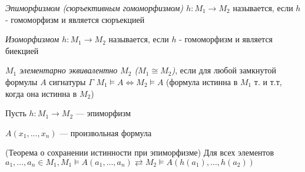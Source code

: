 \documentclass{article}
\begin{document}
\begin{definition}
	\textit{Эпиморфизмом (сюръективным гомоморфизмом) $h: M_1 \rightarrow M_2$} называется, если $h$ - гомоморфизм и является сюръекцией
\end{definition}

\begin{definition}
	\textit{Изоморфизмом $h: M_1 \rightarrow M_2$} называется, если $h$ - гомоморфизм и является биекцией
\end{definition}

\begin{definition}
	\textit{$M_1$ элементарно эквивалентно $M_2$ ($M_1 \cong M_2$)}, если для любой замкнутой формулы $A$ сигнатуры $\Gamma$ $M_1 \vDash A \Leftrightarrow M_2 \vDash A$ (формула истинна в $M_1$ т. и т.т, когда она истинна в $M_2$)
\end{definition}

Пусть $h: M_1 \rightarrow M_2$ --- эпиморфизм

$A(x_1,..., x_n)$ --- произвольная формула
\begin{theorem}{(Теорема о сохранении истинности при эпиморфизме)}
	Для всех элементов $a_1,..., a_n \in M_1, M_1 \vDash A(a_1,..., a_n) \rightleftarrow M_2 \vDash A(h(a_1),..., h(a_2))$ 
\end{theorem}
\end{document}
